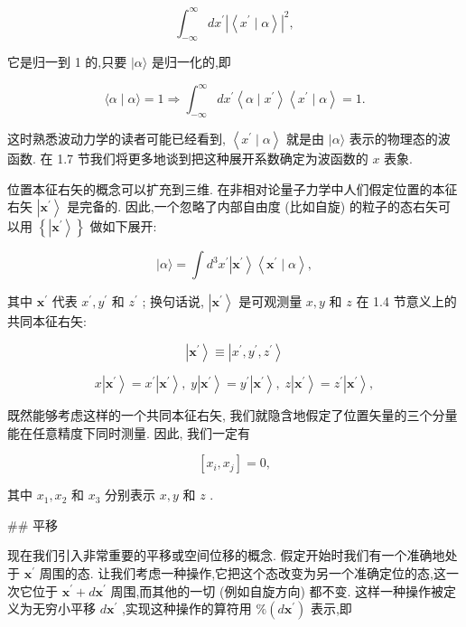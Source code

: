 \documentclass[lang=cn,newtx,10pt,scheme=chinese,thmcnt=section]{elegantbook}
\begin{document}
$$
{\int }_{-\infty }^{\infty }d{x}^{\prime }{\left| \left\langle {x}^{\prime } \mid \alpha \right\rangle \right| }^{2}, \tag{1.6.7}
$$

它是归一到 1 的,只要 $|\alpha \rangle$ 是归一化的,即

$$
\langle \alpha \mid \alpha \rangle = 1 \Rightarrow {\int }_{-\infty }^{\infty }d{x}^{\prime }\left\langle {\alpha \mid {x}^{\prime }}\right\rangle \left\langle {{x}^{\prime } \mid \alpha }\right\rangle = 1. \tag{1.6.8}
$$

这时熟悉波动力学的读者可能已经看到, $\left\langle {{x}^{\prime } \mid \alpha }\right\rangle$ 就是由 $|\alpha \rangle$ 表示的物理态的波函数. 在 1.7 节我们将更多地谈到把这种展开系数确定为波函数的 $x$ 表象.

位置本征右矢的概念可以扩充到三维. 在非相对论量子力学中人们假定位置的本征右矢 $\left| {\mathbf{x}}^{\prime }\right\rangle$ 是完备的. 因此,一个忽略了内部自由度 (比如自旋) 的粒子的态右矢可以用 $\left\{ \left| {\mathbf{x}}^{\prime }\right\rangle \right\}$ 做如下展开:

$$
|\alpha \rangle = \int {d}^{3}{x}^{\prime }\left| {\mathbf{x}}^{\prime }\right\rangle \left\langle {{\mathbf{x}}^{\prime } \mid \alpha }\right\rangle , \tag{1.6.9}
$$

其中 ${\mathbf{x}}^{\prime }$ 代表 ${x}^{\prime },{y}^{\prime }$ 和 ${z}^{\prime }$ ; 换句话说, $\left| {\mathbf{x}}^{\prime }\right\rangle$ 是可观测量 $x, y$ 和 $z$ 在 1.4 节意义上的共同本征右矢:

$$
\left| {\mathbf{x}}^{\prime }\right\rangle \equiv \left| {{x}^{\prime },{y}^{\prime },{z}^{\prime }}\right\rangle \tag{1.6.10a}
$$

$$
x\left| {\mathbf{x}}^{\prime }\right\rangle = {x}^{\prime }\left| {\mathbf{x}}^{\prime }\right\rangle ,\;y\left| {\mathbf{x}}^{\prime }\right\rangle = {y}^{\prime }\left| {\mathbf{x}}^{\prime }\right\rangle ,\;z\left| {\mathbf{x}}^{\prime }\right\rangle = {z}^{\prime }\left| {\mathbf{x}}^{\prime }\right\rangle , \tag{1.6.10b}
$$

既然能够考虑这样的一个共同本征右矢, 我们就隐含地假定了位置矢量的三个分量能在任意精度下同时测量. 因此, 我们一定有

$$
\left\lbrack {{x}_{i},{x}_{j}}\right\rbrack = 0, \tag{1.6.11}
$$

其中 ${x}_{1},{x}_{2}$ 和 ${x}_{3}$ 分别表示 $x, y$ 和 $z$ .

## 平移

现在我们引入非常重要的平移或空间位移的概念. 假定开始时我们有一个准确地处于 ${\mathbf{x}}^{\prime }$ 周围的态. 让我们考虑一种操作,它把这个态改变为另一个准确定位的态,这一次它位于 ${\mathbf{x}}^{\prime } + d{\mathbf{x}}^{\prime }$ 周围,而其他的一切 (例如自旋方向) 都不变. 这样一种操作被定义为无穷小平移 $d{\mathbf{x}}^{\prime }$ ,实现这种操作的算符用 $\% \left( {d{\mathbf{x}}^{\prime }}\right)$ 表示,即
\end{document}
